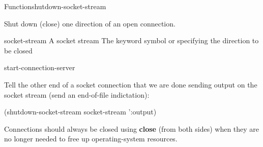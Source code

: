\documentclass[10pt,twoside,english,pdftex]{article}
\begin{document}
\begin{functiondoc}{Function}{shutdown-socket-stream}%
  {}
%
%

\fnsyntax

\fnpurpose Shut down (close) one direction of an open connection.

\fnpackage {}

\fnmodule {}

\fnargs
\begin{args}{socket-stream}
 A socket stream
\arg[direction] The keyword symbol  or  
specifying the direction to be closed
\end{args}

\begin{alsos}{start-connection-server}
\end{alsos}

\fnexample
Tell the other end of a socket connection that we are done sending
output on the socket stream (send an end-of-file indictation):
\begin{example}
  (shutdown-socket-stream socket-stream ':output)
\end{example}

\fnnote Connections should always be closed using \textbf{close} (from
both sides) when they are no longer needed to free up operating-system
resources.

\end{functiondoc}

\end{document}
